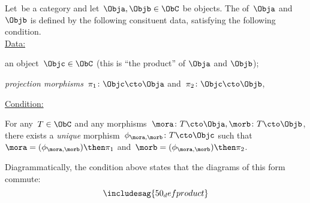 \begin{ctdefinition}
  \label{def:categorical-product}
  Let~\CatC be a category and let~$\Obja, \Objb \in \ObC$ be objects. The \emph{} of~$\Obja$ and~$\Objb$ is defined by the following consituent data, satisfying the following condition. \\
  \underline{Data:}
  \begin{compactenum}
    \item an object~$\Objc \in \ObC$ (this is ``the product'' of $\Obja$  and $\Objb$);
    \item \emph{projection morphisms}~$\pi_1 \colon \Objc \cto \Obja$ and~$\pi_2 \colon \Objc \cto \Objb$,
  \end{compactenum}
  \underline{Condition:}
  \begin{compactenum}
    \item For any~$T \in \ObC$ and any morphisms~$\mora \colon T \cto \Obja, \morb \colon T \cto \Objb$, there exists a \emph{unique} morphism~$\phi_{\mora,\morb} \colon T \cto \Objc$ such that~$\mora = (\phi_{\mora,
      \morb})\then \pi_1$ and~$\morb=(\phi_{\mora, \morb})\then \pi_2$.
  \end{compactenum}
\end{ctdefinition}

\begin{remark}
  Diagrammatically, the condition above states that the diagrams of this form commute:
  \begin{equation}
    \includesag{50_defproduct}
  \end{equation}
\end{remark}


